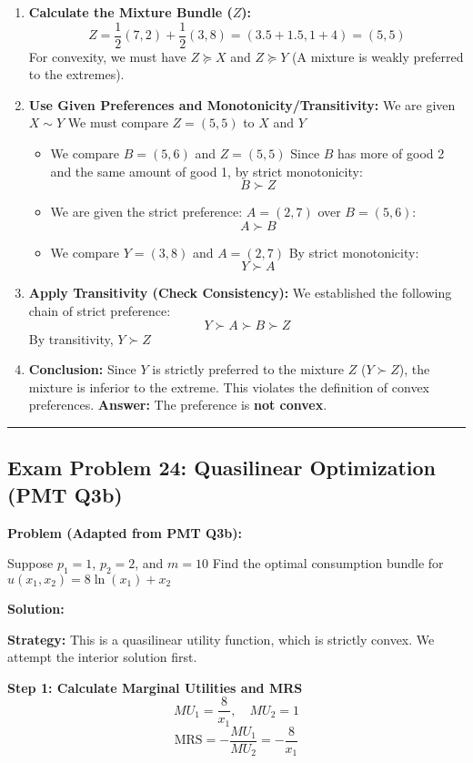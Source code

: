 \documentclass{article}
\begin{document}
\begin{enumerate}
\item \textbf{Calculate the Mixture Bundle ($Z$):} \[ Z = \frac{1}{2}(7, 2) + \frac{1}{2}(3, 8) = (3.5 + 1.5, 1 + 4) = (5, 5) \] For convexity, we must have $Z \succeq X$ and $Z \succeq Y$ (A mixture is weakly preferred to the extremes).
\item \textbf{Use Given Preferences and Monotonicity/Transitivity:} We are given $X \sim Y$ We must compare $Z=(5, 5)$ to $X$ and $Y$
\begin{itemize}
\item We compare $B=(5, 6)$ and $Z=(5, 5)$ Since $B$ has more of good 2 and the same amount of good 1, by strict monotonicity: \[ B \succ Z \]
\item We are given the strict preference: $A=(2, 7)$ over $B=(5, 6)$: \[ A \succ B \]
\item We compare $Y=(3, 8)$ and $A=(2, 7)$ By strict monotonicity: \[ Y \succ A \]
\end{itemize}
\item \textbf{Apply Transitivity (Check Consistency):} We established the following chain of strict preference: \[ Y \succ A \succ B \succ Z \] By transitivity, $Y \succ Z$
\item \textbf{Conclusion:} Since $Y$ is strictly preferred to the mixture $Z$ ($Y \succ Z$), the mixture is inferior to the extreme. This violates the definition of convex preferences. \textbf{Answer:} The preference is \textbf{not convex}.
\end{enumerate}

\vspace{1em}\hrule\vspace{1em}

\subsection*{Exam Problem 24: Quasilinear Optimization (PMT Q3b)}

\textbf{Problem (Adapted from PMT Q3b):}

Suppose $p_1=1$, $p_2=2$, and $m=10$ Find the optimal consumption bundle for $u(x_1, x_2) = 8 \ln(x_1) + x_2$

\textbf{Solution:}

\textbf{Strategy:} This is a quasilinear utility function, which is strictly convex. We attempt the interior solution first.

\textbf{Step 1: Calculate Marginal Utilities and MRS}
\[ MU_1 = \frac{8}{x_1}, \quad MU_2 = 1 \]
\[ \text{MRS} = -\frac{MU_1}{MU_2} = -\frac{8}{x_1} \]
\end{document}
